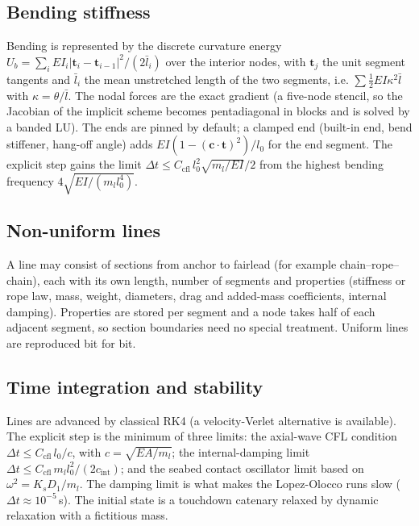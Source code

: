 \documentclass[11pt,a4paper]{article}
\newcommand{\vect}[1]{\boldsymbol{#1}}
\begin{document}
\subsection{Bending stiffness}
Bending is represented by the discrete curvature energy $U_b=\sum_i EI_i\lvert\vect t_i-\vect t_{i-1}\rvert^2/(2\bar l_i)$ over the interior nodes, with $\vect t_j$ the unit segment tangents and $\bar l_i$ the mean unstretched length of the two segments, i.e. $\sum\tfrac12EI\kappa^2\bar l$ with $\kappa=\theta/\bar l$. The nodal forces are the exact gradient (a five-node stencil, so the Jacobian of the implicit scheme becomes pentadiagonal in blocks and is solved by a banded LU). The ends are pinned by default; a clamped end (built-in end, bend stiffener, hang-off angle) adds $EI(1-(\vect c\cdot\vect t)^2)/l_0$ for the end segment. The explicit step gains the limit $\Delta t\le C_{\mathrm{cfl}}\,l_0^2\sqrt{m_l/EI}/2$ from the highest bending frequency $4\sqrt{EI/(m_ll_0^4)}$.

\subsection{Non-uniform lines}
A line may consist of sections from anchor to fairlead (for example chain--rope--chain), each with its own length, number of segments and properties (stiffness or rope law, mass, weight, diameters, drag and added-mass coefficients, internal damping). Properties are stored per segment and a node takes half of each adjacent segment, so section boundaries need no special treatment. Uniform lines are reproduced bit for bit.

\subsection{Time integration and stability}
Lines are advanced by classical RK4 (a velocity-Verlet alternative is available). The explicit step is the minimum of three limits: the axial-wave CFL condition $\Delta t\le C_{\mathrm{cfl}}\,l_0/c$, with $c=\sqrt{EA/m_l}$; the internal-damping limit $\Delta t\le C_{\mathrm{cfl}}\,m_ll_0^2/(2c_{\mathrm{int}})$; and the seabed contact oscillator limit based on $\omega^2=K_sD_1/m_l$. The damping limit is what makes the Lopez-Olocco runs slow ($\Delta t\approx10^{-5}$\,s). The initial state is a touchdown catenary relaxed by dynamic relaxation with a fictitious mass.
\end{document}
